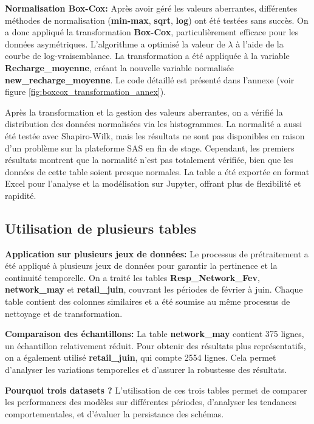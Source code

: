 \textbf{\checkmark Normalisation Box-Cox:}  
Après avoir géré les valeurs aberrantes, différentes méthodes de normalisation (\textbf{min-max}, \textbf{sqrt}, \textbf{log}) ont été testées sans succès. On a donc appliqué la transformation \textbf{Box-Cox}, particulièrement efficace pour les données asymétriques. L'algorithme a optimisé la valeur de \(\lambda\) à l'aide de la courbe de log-vraisemblance. La transformation a été appliquée à la variable \textbf{Recharge\_moyenne}, créant la nouvelle variable normalisée \textbf{new\_recharge\_moyenne}. Le code détaillé est présenté dans l'annexe (voir figure \ref{fig:boxcox_transformation_annex}).

Après la transformation et la gestion des valeurs aberrantes, on a vérifié la distribution des données normalisées via les histogrammes. La normalité a aussi été testée avec Shapiro-Wilk, mais les résultats ne sont pas disponibles en raison d'un problème sur la plateforme SAS en fin de stage. Cependant, les premiers résultats montrent que la normalité n'est pas totalement vérifiée, bien que les données de cette table soient presque normales. La table a été exportée en format Excel pour l'analyse et la modélisation sur Jupyter, offrant plus de flexibilité et rapidité.

\subsection{Utilisation de plusieurs tables}

\textbf{\checkmark Application sur plusieurs jeux de données:}  
Le processus de prétraitement a été appliqué à plusieurs jeux de données pour garantir la pertinence et la continuité temporelle. On a traité les tables \textbf{Resp\_Network\_Fev}, \textbf{network\_may} et \textbf{retail\_juin}, couvrant les périodes de février à juin. Chaque table contient des colonnes similaires et a été soumise au même processus de nettoyage et de transformation.

\noindent \textbf{\checkmark Comparaison des échantillons:}  
La table \textbf{network\_may} contient 375 lignes, un échantillon relativement réduit. Pour obtenir des résultats plus représentatifs, on a également utilisé \textbf{retail\_juin}, qui compte 2554 lignes. Cela permet d'analyser les variations temporelles et d'assurer la robustesse des résultats.

\noindent \textbf{\checkmark Pourquoi trois datasets ?}  
L'utilisation de ces trois tables permet de comparer les performances des modèles sur différentes périodes, d'analyser les tendances comportementales, et d'évaluer la persistance des schémas.

